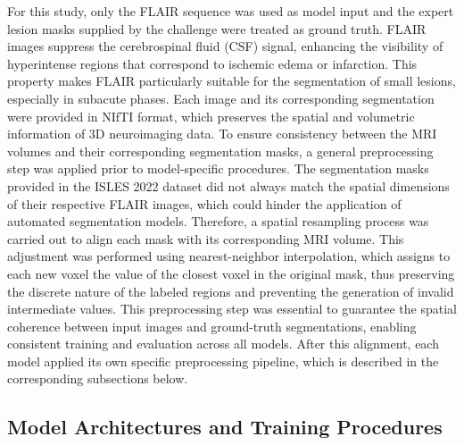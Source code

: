 \documentclass[12pt]{article}
\begin{document}
For this study, only the FLAIR sequence was used as model input and the expert lesion masks supplied by the challenge were treated as ground truth. FLAIR images suppress the cerebrospinal fluid (CSF) signal, enhancing the visibility of hyperintense regions that correspond to ischemic edema or infarction. This property makes FLAIR particularly suitable for the segmentation of small lesions, especially in subacute phases. Each image and its corresponding segmentation were provided in NIfTI format, which preserves the spatial and volumetric information of 3D neuroimaging data. To ensure consistency between the MRI volumes and their corresponding segmentation masks, a general preprocessing step was applied prior to model-specific procedures. The segmentation masks provided in the ISLES 2022 dataset did not always match the spatial dimensions of their respective FLAIR images, which could hinder the application of automated segmentation models. Therefore, a spatial resampling process was carried out to align each mask with its corresponding MRI volume. This adjustment was performed using nearest-neighbor interpolation, which assigns to each new voxel the value of the closest voxel in the original mask, thus preserving the discrete nature of the labeled regions and preventing the generation of invalid intermediate values. This preprocessing step was essential to guarantee the spatial coherence between input images and ground-truth segmentations, enabling consistent training and evaluation across all models. After this alignment, each model applied its own specific preprocessing pipeline, which is described in the corresponding subsections below.



\subsection{Model Architectures and Training Procedures}\label{subsec:models}
\end{document}
